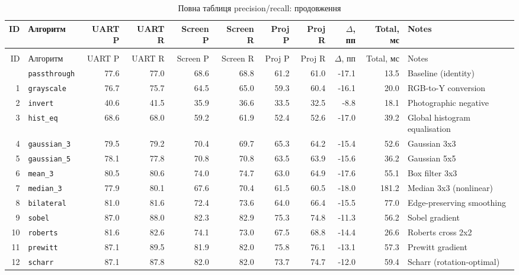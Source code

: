 \begin{landscape}
\begin{longtable}{@{}r >{\raggedright\arraybackslash\ttfamily}p{2.8cm} r r r r r r r r >{\raggedright\arraybackslash}p{3.4cm}@{}}
\caption{Повна таблиця результатів: precision та recall для трьох сценаріїв.}\label{tab:all_results_pr}\\
\toprule
ID & Алгоритм & UART P & UART R & Screen P & Screen R & Proj P & Proj R & $\Delta$, пп & Total, мс & Notes \\
\midrule
\endfirsthead
\caption[]{Повна таблиця precision/recall: продовження}\\
\toprule
ID & Алгоритм & UART P & UART R & Screen P & Screen R & Proj P & Proj R & $\Delta$, пп & Total, мс & Notes \\
\midrule
\endhead
\bottomrule
\endfoot
0 & \texttt{passthrough} & 77.6 & 77.0 & 68.6 & 68.8 & 61.2 & 61.0 & -17.1 & 13.5 & Baseline (identity) \\
1 & \texttt{grayscale} & 76.7 & 75.7 & 64.5 & 65.0 & 59.3 & 60.4 & -16.1 & 20.0 & RGB-to-Y conversion \\
2 & \texttt{invert} & 40.6 & 41.5 & 35.9 & 36.6 & 33.5 & 32.5 & -8.8 & 18.1 & Photographic negative \\
3 & \texttt{hist\_eq} & 68.6 & 68.0 & 59.2 & 61.9 & 52.4 & 52.6 & -17.0 & 39.2 & Global histogram equalisation \\
4 & \texttt{gaussian\_3} & 79.5 & 79.2 & 70.4 & 69.7 & 65.3 & 64.2 & -15.4 & 52.6 & Gaussian 3x3 \\
5 & \texttt{gaussian\_5} & 78.1 & 77.8 & 70.8 & 70.8 & 63.5 & 63.9 & -15.6 & 36.2 & Gaussian 5x5 \\
6 & \texttt{mean\_3} & 80.5 & 80.6 & 74.0 & 74.7 & 63.0 & 64.9 & -17.6 & 55.1 & Box filter 3x3 \\
7 & \texttt{median\_3} & 77.9 & 80.1 & 67.6 & 70.4 & 61.5 & 60.5 & -18.0 & 181.2 & Median 3x3 (nonlinear) \\
8 & \texttt{bilateral} & 81.0 & 81.6 & 72.4 & 73.6 & 64.0 & 66.4 & -15.5 & 77.0 & Edge-preserving smoothing \\
9 & \texttt{sobel} & 87.0 & 88.0 & 82.3 & 82.9 & 75.3 & 74.8 & -11.3 & 56.2 & Sobel gradient \\
10 & \texttt{roberts} & 81.6 & 82.6 & 74.1 & 73.0 & 67.5 & 68.8 & -14.4 & 26.6 & Roberts cross 2x2 \\
11 & \texttt{prewitt} & 87.1 & 89.5 & 81.9 & 82.0 & 75.8 & 76.1 & -13.1 & 57.3 & Prewitt gradient \\
12 & \texttt{scharr} & 87.1 & 87.8 & 82.0 & 82.0 & 73.7 & 74.7 & -12.0 & 59.4 & Scharr (rotation-optimal) \\

\end{longtable}
\end{landscape}
